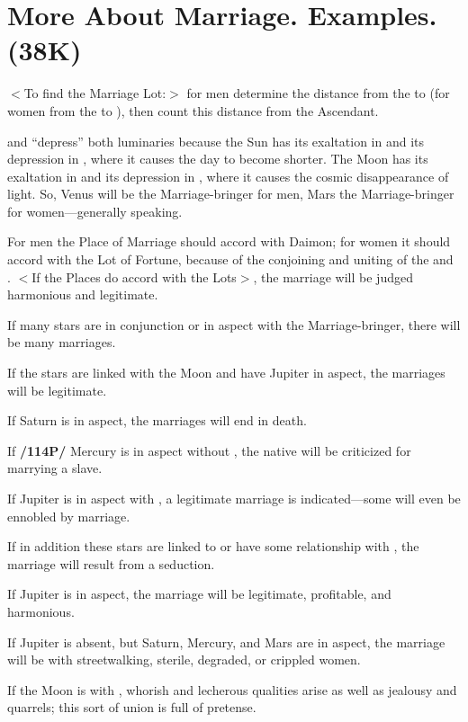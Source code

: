 \section{More About Marriage. Examples. (38K)}

$<$To find the Marriage Lot:$>$ for men determine the distance from the \Sun\xspace to \Venus\xspace (for women from the \Moon\xspace to \Mars), then count this distance from the Ascendant. 

\Venus\xspace and \Mars\xspace “depress” both luminaries because the Sun has its exaltation in \Aries\xspace and its depression in \Libra, where it causes the day to become shorter. The Moon has its exaltation in \Taurus\xspace and its depression in \Scorpio, where it causes the cosmic disappearance of light. So, Venus will be the Marriage-bringer for men, Mars the Marriage-bringer for women—generally speaking. 

For men the Place of Marriage should accord with Daimon; for women it should accord with the Lot of Fortune, because of the conjoining and uniting of the \Sun\xspace and \Moon. $<$If the
Places do accord with the Lots$>$, the marriage will be judged harmonious and legitimate. 

If many stars are in conjunction or in aspect with the Marriage-bringer, there will be many marriages. 

If the stars are linked with the Moon and have Jupiter in aspect, the marriages will be legitimate. 

If Saturn is in aspect, the marriages will end in death. 

If \textbf{/114P/} Mercury is in aspect without \Jupiter, the native will be criticized for marrying a slave. 

If Jupiter is in aspect with \Saturn, a legitimate marriage is indicated—some will even be ennobled by marriage. 

If in addition these stars are linked to or have some relationship with \Venus, the marriage will result from a seduction. 

If Jupiter is in aspect, the marriage will be legitimate, profitable, and harmonious. 

If Jupiter is absent, but Saturn, Mercury, and Mars are in aspect, the marriage will be with streetwalking, sterile, degraded, or crippled women. 

If the Moon is with \Venus, whorish and lecherous qualities arise as well as jealousy and quarrels; this sort of union is full of pretense. 

